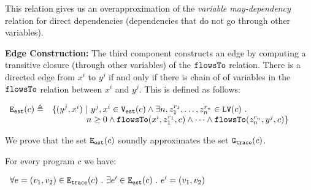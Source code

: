 This relation gives us an overapproximation of the \emph{variable may-dependency} relation for direct dependencies (dependencies that do not go through other variables).

\noindent\textbf{Edge Construction:} The third component constructs an edge by computing a transitive closure (through other variables) of the  
 $\mathtt{flowsTo}$ relation. There is a directed edge from  $x^i$ to $y^j$ if and only if there is chain of of variables 
    in the $\mathtt{flowsTo}$ relation between $x^i$ and $y^j$. This is defined as follows:
   \begin{center}
$
\begin{array}{cl}
    \mathtt{{E_{est}}}(c) \triangleq &
    \{ 
    (y^j, x^i)  ~ \vert ~ y^j, x^i \in \mathtt{{V_{est}}}(c)
    \land
      \exists n, z_1^{r_1}, \ldots, z_n^{r_n} \in \mathtt{LV}(c) ~.~ 
    \\ 
    & \qquad \qquad
      n \geq 0 \land
      \mathtt{flowsTo}(x^i,  z_1^{r_1}, c) 
      \land \cdots \land \mathtt{flowsTo}(z_n^{r_n}, y^j, c) 
    \}
    \end{array}
$
\end{center}    
We prove that the set $\mathtt{{E_{est}}}(c)$ soundly approximates the set $\mathtt{{G_{trace}}}(c)$.
	\begin{lem}
	\label{lem:edge_map}
	For every program $c$ we have:
   \begin{center}
$
	\begin{array}{l}
	\forall e = (v_1, v_2) \in \mathtt{{E_{trace}}}(c)
	~.~ 
	\exists e' \in \mathtt{{E_{est}}}(c) ~.~ e' = (v_1, v_2)
	\end{array}
$
\end{center} 
	\end{lem}

